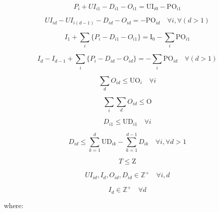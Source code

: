 \documentclass[authoryear,preprint,12pt]{elsarticle}
\begin{document}
\begin{equation}
\label{eq:mmeq03}
P_i + UI_{i1} - D_{i1} - O_{i1} = \textrm{UI}_{i0} - \textrm{PO}_{i1}
\end{equation}

\begin{equation}
\label{eq:mmeq04}
UI_{id} - UI_{i(d-1)} - D_{id} - O_{id} = - \textrm{PO}_{id} \quad \forall i, \forall (d>1)
\end{equation}

\begin{equation}
\label{eq:mmeq05}
I_{1} + \sum_{i}\{P_i -  D_{i1} - O_{i1}\} = \textrm{I}_{0} - \sum_{i}{\textrm{PO}_{i1}}
\end{equation}

\begin{equation}
I_{d} - I_{d-1} + \sum_{i}\{P_i -  D_{id} - O_{id}\} = - \sum_{i}{\textrm{PO}_{id}} \quad \forall (d>1)
\end{equation}

\begin{equation}
\sum_{d}{O_{id}} \leq \textrm{UO}_i \quad \forall i
\end{equation}

\begin{equation}
\sum_{i}{\sum_{d}{O_{id}}} \leq \textrm{O}
\end{equation}

\begin{equation}
\label{eq:mmeq09}
D_{i1} \leq \textrm{UD}_{i1} \quad \forall i
\end{equation}

\begin{equation}
D_{id} \leq \sum_{k=1}^{d}{\textrm{UD}_{ik}} - \sum_{k=1}^{d-1}{D_{ik}}  \quad \forall i, \forall d>1
\end{equation}

\begin{equation}
T \leq \textrm{Z}
\end{equation}

\begin{equation}
UI_{id}, I_{d}, O_{id}, D_{id} \in  \mathbb{Z}^+ \quad \forall i,d
\end{equation}

\begin{equation}
I_{d} \in  \mathbb{Z}^+ \quad \forall d
\end{equation}

where: \\
\end{document}
